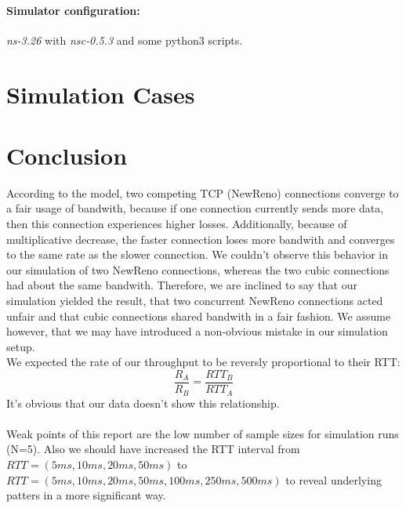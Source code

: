 \documentclass{article}
\begin{document}
\paragraph{Simulator configuration:} \emph{ns-3.26} with \emph{nsc-0.5.3} and some python3 scripts.


 
\section{Simulation Cases} \label{results}

\let\clearpage\relax



\section{Conclusion} \label{conclusion}
According to the model, two competing TCP (NewReno) connections converge to a fair usage of bandwith, because if one connection currently sends more data, then this connection experiences higher losses. Additionally, because of multiplicative decrease, the faster connection loses more bandwith and converges to the same rate as the slower connection. We couldn't observe this behavior in our simulation of two NewReno connections, whereas the two cubic connections had about the same bandwith. Therefore, we are inclined to say that our simulation yielded the result, that two concurrent NewReno connections acted unfair and that cubic connections shared bandwith in a fair fashion. We assume however, that we may have introduced a non-obvious mistake in our simulation setup.\\
We expected the rate of our throughput to be  reversly proportional to their RTT: $$\frac{R_A}{R_B} = \frac{RTT_B}{RTT_A} $$ It's obvious that our data doesn't show this relationship.\\\\
Weak points of this report are the low number of sample sizes for simulation runs (N=5). Also we should have increased the RTT interval from $RTT=(5ms, 10ms, 20ms, 50ms)$ to $RTT=(5ms, 10ms, 20ms, 50ms, 100ms, 250ms, 500ms)$ to reveal underlying patters in a more significant way.



\let\clearpage\relax

\end{document}
